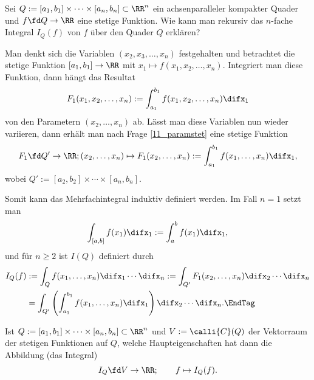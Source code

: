 \begin{frage}\label{11_mehrfachint}
  Sei $Q := [a_1,b_1]\times \cdots \times [a_n,b_n] \subset\RR^n$ ein 
  achsenparalleler kompakter Quader und $f\fd Q\to\RR$ eine 
  stetige Funktion. Wie kann man rekursiv das $n$-fache 
  Integral $I_Q(f)$ von $f$ über den Quader $Q$ erklären?
\end{frage}

\begin{antwort}
  Man denkt sich die Variablen $(x_2,x_3,\ldots,x_n)$ festgehalten und 
  betrachtet die stetige Funktion $[a_1,b_1]\to \RR$ mit 
  $x_1 \mapsto f(x_1,x_2,\ldots,x_n)$. Integriert man diese 
  Funktion, dann hängt das Resultat
  \[
  F_1(x_1,x_2,\ldots,x_n ):= \int_{a_1}^{b_1} f(x_1,x_2,\ldots,x_n)\difx_1 
  \]
  von den Parametern $(x_2,\ldots,x_n)$ ab. Lässt man diese Variablen 
  nun wieder variieren, dann erhält man nach Frage \ref{11_paramstet} 
  eine stetige Funktion
  \[
  F_1 \fd Q' \to \RR; 
  (x_2,\ldots,x_n) \mapsto F_1(x_2,\ldots,x_n) := \int_{a_1}^{b_1} 
  f(x_1,\ldots, x_n ) \difx_1,
  \]
  wobei $Q':=[a_2,b_2]\times \cdots\times [a_n,b_n]$. 

  Somit kann das Mehrfachintegral induktiv definiert 
  werden. Im Fall $n=1$ setzt man  
  \[
  \int_{[a,b]} f(x_1) \difx_1 := \int_a^b f(x_1) \difx_1 ,
  \]
  und für $n\ge 2$ ist $I(Q)$ definiert durch
  \begin{align}
    I_Q(f) &:= \int_Q f(x_1,\ldots,x_n)\difx_1 \cdots \difx_n 
    := \int_{Q'} F_1( x_2,\ldots, x_n ) \difx_2\cdots\difx_n \notag \\
    &=
    \int_{Q'} \left( \int_{a_1}^{b_1} f(x_1,\ldots,x_n ) \difx_1 \right)
    \difx_2 \cdots \difx_n . \EndTag
  \end{align}
\end{antwort}

\begin{frage}
  Ist $Q := [a_1,b_1]\times \cdots \times [a_n,b_n] \subset\RR^n$ 
  und $V := \calli{C}(Q)$ der Vektorraum der stetigen Funktionen auf 
  $Q$, welche Haupteigenschaften hat dann die Abbildung (das Integral) 
  \[
  I_Q \fd V \to \RR; \qquad f\mapsto I_Q(f).
  \]
\end{frage}

